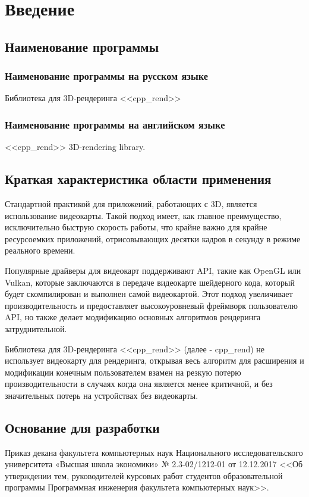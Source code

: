 \section{Введение}

\subsection{Наименование программы}

\subsubsection{Наименование программы на русском языке}

Библиотека для 3D-рендеринга <<cpp\_rend>>

\subsubsection{Наименование программы на английском языке}

<<cpp\_rend>> 3D-rendering library.

\subsection{Краткая характеристика области применения}

Стандартной практикой для приложений, работающих с 3D, является использование видеокарты. Такой подход имеет, как главное преимущество, исключительно быструю скорость работы, что крайне важно для крайне ресурсоемких приложений, отрисовывающих десятки кадров в секунду в режиме реального времени.

Популярные драйверы для видеокарт поддерживают API, такие как OpenGL или Vulkan, которые заключаются в передаче видеокарте шейдерного кода, который будет скомпилирован и выполнен самой видеокартой. Этот подход увеличивает производительность и предоставляет высокоуровневый фреймворк пользователю API, но также делает модификацию основных алгоритмов рендеринга затруднительной.

Библиотека для 3D-рендеринга <<cpp\_rend>> (далее - cpp\_rend) не использует видеокарту для рендеринга, открывая весь алгоритм для расширения и модификации конечным пользователем взамен на резкую потерю производительности в случаях когда она является менее критичной, и без значительных потерь на устройствах без видеокарты.

\subsection{Основание для разработки}

Приказ декана факультета компьютерных наук Национального исследовательского университета «Высшая школа экономики» № 2.3-02/1212-01 от 12.12.2017 <<Об утверждении тем, руководителей курсовых работ студентов образовательной программы Программная инженерия факультета компьютерных наук>>.
